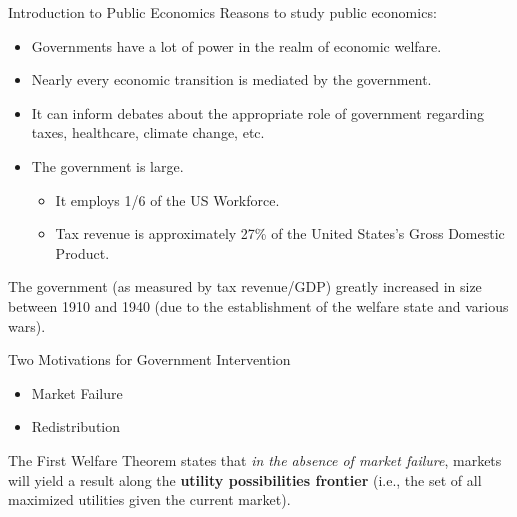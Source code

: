 \documentclass[8pt]{extarticle}
\begin{document}
\begin{problem}{Introduction to Public Economics}
   Reasons to study public economics:
    \begin{itemize}
      \item Governments have a lot of power in the realm of economic welfare.
      \item Nearly every economic transition is mediated by the government.
      \item It can inform debates about the appropriate role of government regarding taxes, healthcare, climate change, etc.
      \item The government is large.
        \begin{itemize}
          \item It employs 1/6 of the US Workforce.
          \item Tax revenue is approximately 27\% of the United States's Gross Domestic Product.
        \end{itemize}
    \end{itemize}
    The government (as measured by tax revenue/GDP) greatly increased in size between 1910 and 1940 (due to the establishment of the welfare state and various wars).
    \begin{center}
    \end{center}
    \begin{problem}{Two Motivations for Government Intervention}
      \begin{itemize}
        \item Market Failure
        \item Redistribution
      \end{itemize}
      The First Welfare Theorem states that \textit{in the absence of market failure}, markets will yield a result along the \textbf{utility possibilities frontier} (i.e., the set of all maximized utilities given the current market).


\end{problem}
\end{problem}
\end{document}
